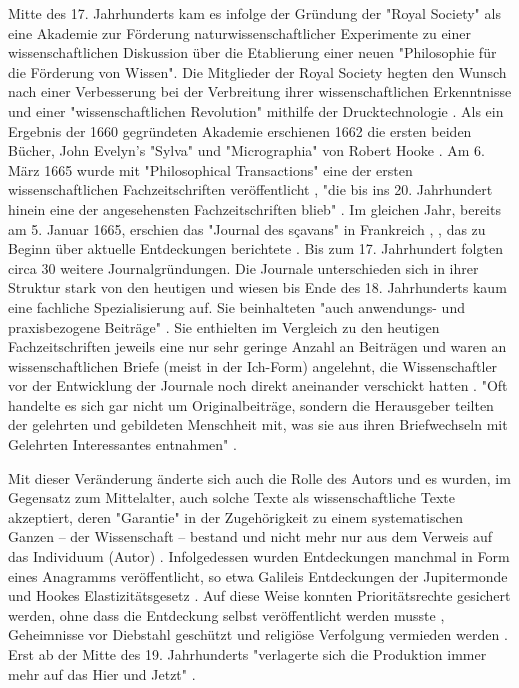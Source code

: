 Mitte des 17. Jahrhunderts kam es infolge der Gründung der "Royal Society" als eine Akademie zur Förderung naturwissenschaftlicher Experimente zu einer wissenschaftlichen Diskussion über die Etablierung einer neuen "Philosophie für die Förderung von Wissen". Die Mitglieder der Royal Society hegten den Wunsch nach einer Verbesserung bei der Verbreitung ihrer wissenschaftlichen Erkenntnisse und einer "wissenschaftlichen Revolution" mithilfe der Drucktechnologie \cite{Dear_1985}. Als ein Ergebnis der 1660 gegründeten Akademie erschienen 1662 die ersten beiden Bücher, John Evelyn's "Sylva" und "Micrographia" von Robert Hooke \cite{hall_1992_library_rsol}. Am 6. März 1665 wurde mit "Philosophical Transactions" eine der ersten wissenschaftlichen Fachzeitschriften veröffentlicht \cite{Peters_2014}, "die bis ins 20. Jahrhundert hinein eine der angesehensten Fachzeitschriften blieb" \cite{graefen2007_wissenschaftliche_artikel}. Im gleichen Jahr, bereits am  5. Januar 1665, erschien das "Journal des sçavans" in Frankreich \cite{ball_2011_zeitalter}, \cite{hollricher_wandel_2009}, das zu Beginn über aktuelle Entdeckungen berichtete \cite{epaa_Weiner_2001}. Bis zum 17. Jahrhundert folgten circa 30 weitere Journalgründungen. Die Journale unterschieden sich in ihrer Struktur stark von den heutigen und wiesen bis Ende des 18. Jahrhunderts kaum eine fachliche Spezialisierung auf. Sie beinhalteten "auch anwendungs- und praxisbezogene Beiträge" \cite{graefen2007_wissenschaftliche_artikel}. Sie enthielten im Vergleich zu den heutigen Fachzeitschriften jeweils eine nur sehr geringe Anzahl an Beiträgen und waren an wissenschaftlichen Briefe (meist in der Ich-Form) angelehnt, die Wissenschaftler vor der Entwicklung der Journale noch direkt aneinander verschickt hatten \cite{epaa_Weiner_2001}. "Oft handelte es sich gar nicht um Originalbeiträge, sondern die Herausgeber teilten der gelehrten und gebildeten Menschheit mit, was sie aus ihren Briefwechseln mit Gelehrten Interessantes entnahmen" \cite{graefen2007_wissenschaftliche_artikel}.

Mit dieser Veränderung änderte sich auch die Rolle des Autors und es wurden, im Gegensatz zum Mittelalter, auch solche Texte als wissenschaftliche Texte akzeptiert, deren "Garantie" in der Zugehörigkeit zu einem systematischen Ganzen – der Wissenschaft – bestand und nicht mehr nur aus dem Verweis auf das Individuum (Autor) \cite{foucault_2000_autor}. Infolgedessen wurden Entdeckungen manchmal in Form eines Anagramms veröffentlicht, so etwa Galileis Entdeckungen der Jupitermonde \cite{miner2007discovery} und Hookes Elastizitätsgesetz \cite{szabo_2013_geschichte}. Auf diese Weise konnten Prioritätsrechte gesichert werden, ohne dass die Entdeckung selbst veröffentlicht werden musste \cite{miner2007discovery}, Geheimnisse vor Diebstahl geschützt und religiöse Verfolgung vermieden werden \cite{resnik_2005_ethics}. Erst ab der Mitte des 19. Jahrhunderts "verlagerte sich die Produktion immer mehr auf das Hier und Jetzt" \cite{hagner_2015_sache_buches}.

